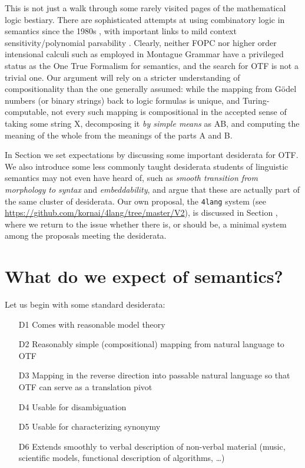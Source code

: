 \documentclass[output=paper,colorlinks=true,citecolor=brown]{langscibook}
\begin{document}
This is not just a walk through some rarely visited pages of the mathematical
logic bestiary. There are sophisticated attempts at using combinatory logic in
semantics since the 1980s \citep{Szabolcsi:1987,Steedman:1987,Jacobson:1999,Baldridge:2002}, with
important links to mild context sensitivity/polynomial parsability
\citep{Joshi:1990}. Clearly, neither FOPC nor higher order intensional calculi
such as employed in Montague Grammar have a privileged status as the One True
Formalism for semantics, and the search for OTF is not a trivial one. Our
argument will rely on a stricter understanding of compositionality than the
one generally assumed: while the mapping from Gödel numbers (or binary
strings) back to logic formulas is unique, and Turing-computable, not every
such mapping is compositional in the accepted sense of taking some string X,
decomposing it \emph{by simple means} as AB, and computing the meaning of
the whole from the meanings of the parts A and B. 

In Section  we set expectations by discussing some important
desiderata for OTF.  We also introduce some less commonly taught desiderata
students of linguistic semantics may not even have heard of, such as \emph{smooth transition from morphology to syntax} and \emph{embeddability}, and
argue that these are actually part of the same cluster of desiderata.  Our own
proposal, the \texttt{4lang} system (see \url{https://github.com/kornai/4lang/tree/master/V2}), is discussed in
Section , where we return to the issue whether there is, or should
be, a minimal system among the proposals meeting the desiderata.

\section{What do we expect of semantics?}\label{expect}

Let us begin with some standard desiderata: 

\begin{enumerate}
\item[D1] Comes with reasonable model theory
\item[D2] Reasonably simple (compositional) mapping from natural language to
  OTF
\item[D3] Mapping in the reverse direction into passable natural language so that
  OTF can serve as a translation pivot
\item[D4] Usable for disambiguation
\item[D5] Usable for characterizing synonymy
\item[D6] Extends smoothly to verbal description of non-verbal material (music,
  scientific models, functional description of algorithms, \ldots)
\end{enumerate}
\end{document}
